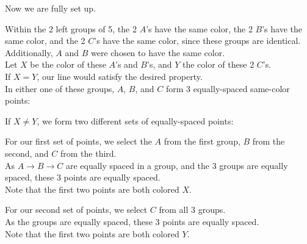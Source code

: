 \documentclass[11pt]{article}
\edef\getxnow(#1,#2){#1}
\edef\getynow(#1,#2){#2}
\newcommand*{\getx}[1]{\expandafter\getxnow#1}
\newcommand*{\gety}[1]{\expandafter\getynow#1}
\newcommand*{\scalePic}{0.4}
\newcommand*{\gridArg}[7]{%
    \foreach \x in {\fpeval{#1},\fpeval{#1+#2},...,\fpeval{#3+0.0001}} %
        \draw [black, thin, #7] (\x,\fpeval{#4}) -- (\x,\fpeval{#6+0.0001});
    \foreach \y in {\fpeval{#4},\fpeval{#4+#5},...,\fpeval{#6+0.0001}}
        \draw [black, thin, #7] (\fpeval{#1},\y) -- (\fpeval{#3+0.0001},\y);
}
\newcommand*{\grid}[6]{\gridArg{#1}{#2}{#3}{#4}{#5}{#6}{}}%
\newcommand*{\mybigbox}[4]{\grid{#1}{#3}{#1+#3}{#2}{#4}{#2+#4}} %
\newcommand*{\mybox}[2]{\mybigbox{#1}{#2}{1}{1}} %
\newcommand*{\myboxes}[1]{\foreach \pt in {#1} {\mybox{\getx{\pt}}{\gety{\pt}}}}
\newcommand*{\labelabove}[3]{\node[above, outer sep=5pt] at (#1 + 0.5, #2 + 0.5){#3};} %
\begin{document}
Now we are fully set up.

Within the 2 left groups of 5, the 2 $A$'s have the same color, the 2 $B$'s have the same color, and the 2 $C$'s have the same color, since these groups are identical.\\
Additionally, $A$ and $B$ were chosen to have the same color.\\
Let $X$ be the color of these $A$'s and $B$'s, and $Y$ the color of these 2 $C$'s.\\

If $X=Y$, our line would satisfy the desired property.\\
In either one of these groups, $A$, $B$, and $C$ form 3 equally-spaced same-color points:
\begin{center}
\end{center}

If $X\neq Y$, we form two different sets of equally-spaced points:

For our first set of points, we select the $A$ from the first group, $B$ from the second, and $C$ from the third.\\
As $A\rightarrow B\rightarrow C$ are equally spaced in a group, and the 3 groups are equally spaced, these 3 points are equally spaced.\\
Note that the first two points are both colored $X$.

\begin{center}
\end{center}

For our second set of points, we select $C$ from all 3 groups.\\
As the groups are equally spaced, these 3 points are equally spaced.\\
Note that the first two points are both colored $Y$.
\end{document}
